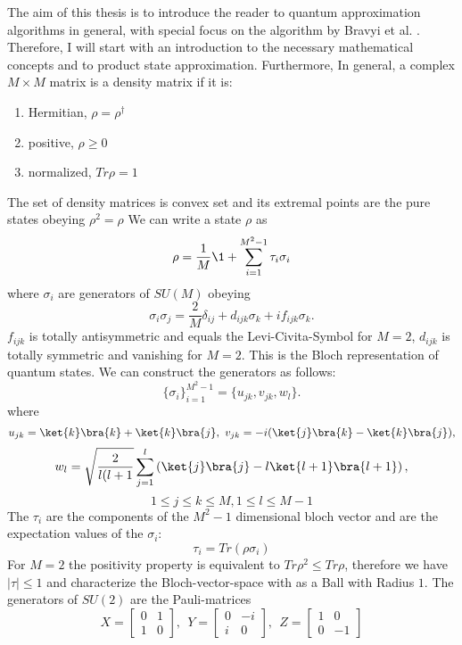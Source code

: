 The aim of this thesis is to introduce the reader to quantum approximation algorithms in general, with special focus on the algorithm by Bravyi et al. \cite{bravyi19}.
Therefore, I will start with an introduction to the necessary mathematical concepts and to product state approximation.
Furthermore, 
In general, a complex $M \times M$ matrix is a density matrix if it is:
\begin{center}\begin{enumerate}
	\item Hermitian, $\rho =\rho^{\dagger}$
	\item positive,	$\rho \ge 0$
	\item normalized, $Tr\rho = 1$
\end{enumerate}\end{center}
The set of density matrices is convex set and its extremal points are the pure states obeying $\rho^2 = \rho$
We can write a state $\rho$ as
$$\rho = \frac{1}{M} \1 + \sum_{i=1}^{M^2-1} \tau_i \sigma_i$$
where $\sigma_i$ are generators of $SU(M)$ obeying
\[
	\sigma_i\sigma_j = \frac{2}{M}\delta_{ij} + d_{ijk}\sigma_k + if_{ijk}\sigma_k
.\]
$f_{ijk}$ is totally antisymmetric and equals the Levi-Civita-Symbol for $M=2$, $d_{ijk}$ is totally symmetric and vanishing for $M=2$.
This is the Bloch representation of quantum states.
We can construct the generators as follows:\cite{kimura03}
 \[
\{\sigma_i\}^{M^2-1}_{i=1} = \{u_{jk},v_{jk},w_l\}
.\]
where
$$
	u_{jk} = \ket{k}\bra{k}+\ket{k}\bra{j}, ~ v_{jk} = -i(\ket{j}\bra{k}-\ket{k}\bra{j}),
$$
$$
	w_l = \sqrt{\frac{2}{l(l+1}} \sum_{j=1}^{l} \left( \ket{j}\bra{j}-l\ket{l+1}\bra{l+1} \right),$$
	$$ 1\le j\le k\le M, 1\le l\le M-1$$
The $\tau_i$ are the components of the $M^2-1$ dimensional bloch vector and are the expectation values of the $\sigma_i$:
$$
	 \tau_i = Tr(\rho\sigma_i)
$$
For $M=2$ the positivity property is equivalent to $Tr\rho^2\le Tr\rho$, therefore we have $|\tau|\le 1$ and characterize the Bloch-vector-space with as a Ball with Radius $1$.
The generators of $SU(2)$ are the Pauli-matrices
$$
 X = \begin{bmatrix} 0 & 1 \\
                    1 & 0
        \end{bmatrix},~
    ~Y = \begin{bmatrix} 0 & -i \\
                    i & 0
         \end{bmatrix},~
    ~Z = \begin{bmatrix} 1 & 0 \\
                    0 & -1
        \end{bmatrix}
$$
